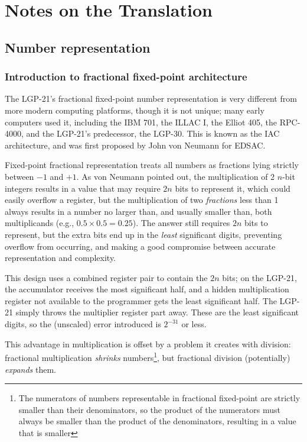 \section{Notes on the Translation}
\subsection{Number representation}
\subsubsection*{Introduction to fractional fixed-point architecture}
The LGP-21's fractional fixed-point number representation is very different from more modern computing platforms, though it is not unique; many early computers used it, including the IBM 701\cite{ibm701manual}, the ILLAC I\cite{illiac1954}, the Elliot 405\cite{elliott405}, the RPC-4000\cite{rpc4000manual}, and the LGP-21's predecessor, the LGP-30\cite{lgp30programmingmanual}. This is known as the IAC architecture, and was first proposed by John von Neumann for EDSAC\cite{vonneumann1945first}.

Fixed-point fractional representation treats all numbers as fractions lying strictly between $-1$ and $+1$. As von Neumann pointed out\cite{burks1946preliminary}, the multiplication of 2 $n$-bit integers results in a value that may require $2n$ bits to represent it, which could easily overflow a register, but the multiplication of two \emph{fractions} less than 1 always results in a number no larger than, and usually smaller than, both multiplicands (e.g., $0.5 \times 0.5 = 0.25$). The answer still requires $2n$ bits to represent, but the extra bits end up in the \emph{least} significant digits, preventing overflow from occurring, and making a good compromise between accurate representation and complexity.

This design uses a combined register pair to contain the $2n$ bits; on the LGP-21, the accumulator receives the most significant half, and a hidden multiplication register not available to the programmer gets the least significant half. The LGP-21 simply throws the multiplier register part away. These are the least significant digits, so the (unscaled) error introduced is $2^{-31}$ or less.

This advantage in multiplication is offset by a problem it creates with division: fractional multiplication \emph{shrinks} numbers\footnote{The numerators of numbers representable in fractional fixed-point are strictly smaller than their denominators, so the product of the numerators must always be smaller than the product of the denominators, resulting in a value that is smaller}, but fractional division (potentially) \emph{expands} them.

